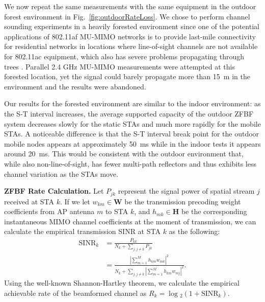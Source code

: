 	We now repeat the same measurements with the same equipment in the outdoor forest environment in Fig.~\ref{fig:outdoorRateLoss}.
	We chose to perform channel sounding experiments in a heavily forested environment since one of the potential applications of 802.11af \ac{MU-MIMO} networks is to provide last-mile connectivity for residential networks in locations where line-of-sight channels are not available for 802.11ac equipment, which also has severe problems propagating through trees \cite{durgin1998measurements}.
	Parallel 2.4 GHz \ac{MU-MIMO} measurements were attempted at this forested location, yet the signal could barely propagate more than 15~m in the environment and the results were abandoned.
	
	Our results for the forested environment are similar to the indoor environment: as the S-T interval increases, the average supported capacity of the outdoor \ac{ZFBF} system decreases slowly for the static \acp{STA} and much more rapidly for the mobile \acp{STA}.
	A noticeable difference is that the S-T interval break point for the outdoor mobile nodes appears at approximately 50~ms while in the indoor tests it appears around 20~ms.
	This would be consistent with the outdoor environment that, while also non-line-of-sight, has fewer multi-path reflectors and thus exhibits less channel variation as the \acp{STA} move.


\textbf{\ac{ZFBF} Rate Calculation.}
 Let $P_{jk}$ represent the signal power of spatial stream $j$ received at \ac{STA} $k$.
 If we let $w_{km} \in \mathbf{W}$ be the transmission precoding weight coefficients from \ac{AP} antenna $m$ to \ac{STA} $k$, and $h_{mk} \in \mathbf{H}$ be the corresponding instantaneous \ac{MIMO} 
channel coefficients at the moment of transmission, we can calculate the empirical transmission \ac{SINR} at \ac{STA} $k$ as the following:
\begin{align}
\text{SINR}_k &= \frac{P_{kk}}{N_k + \sum_{j,j\neq k}P_{jk}} \\
              &= \frac{|\sum_{m=1}^{M}h_{km}w_{mk}|^2}{N_k + \sum_{j,j\neq k} |\sum_{m=1}^{M}h_{km}w_{mj}|^2}. \label{eq_zfbf_capacity}
\end{align}
 Using the well-known Shannon-Hartley theorem, we calculate the empirical achievable rate of the beamformed channel as $R_k = \log{}_2(1+\text{SINR}_k)$.

